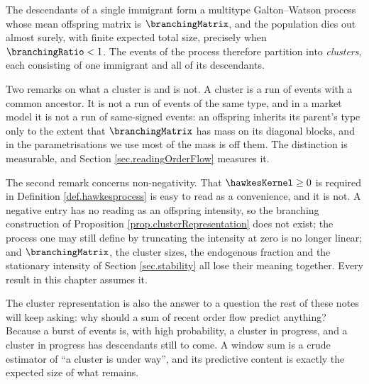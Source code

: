 The descendants of a single immigrant form a multitype Galton--Watson process
whose mean offspring matrix is $\branchingMatrix$,
and the population dies out almost surely, with finite expected total size,
precisely when $\branchingRatio < 1$.
The events of the process therefore partition into \emph{clusters},
each consisting of one immigrant and all of its descendants.

Two remarks on what a cluster is and is not.
A cluster is a run of events with a common ancestor.
It is not a run of events of the same type,
and in a market model it is not a run of same-signed events:
an offspring inherits its parent's type only to the extent that
$\branchingMatrix$ has mass on its diagonal blocks,
and in the parametrisations we use most of the mass is off them.
The distinction is measurable, and Section \ref{sec.readingOrderFlow} measures it.

The second remark concerns non-negativity.
That $\hawkesKernel \geq 0$ is required in Definition \ref{def.hawkesprocess}
is easy to read as a convenience, and it is not.
A negative entry has no reading as an offspring intensity,
so the branching construction of Proposition \ref{prop.clusterRepresentation}
does not exist;
the process one may still define by truncating the intensity at zero is no longer linear;
and $\branchingMatrix$, the cluster sizes, the endogenous fraction and the stationary intensity
of Section \ref{sec.stability} all lose their meaning together.
Every result in this chapter assumes it.

The cluster representation is also the answer to a question the rest of these notes will keep
asking: why should a sum of recent order flow predict anything?
Because a burst of events is, with high probability, a cluster in progress,
and a cluster in progress has descendants still to come.
A window sum is a crude estimator of ``a cluster is under way'',
and its predictive content is exactly the expected size of what remains.
